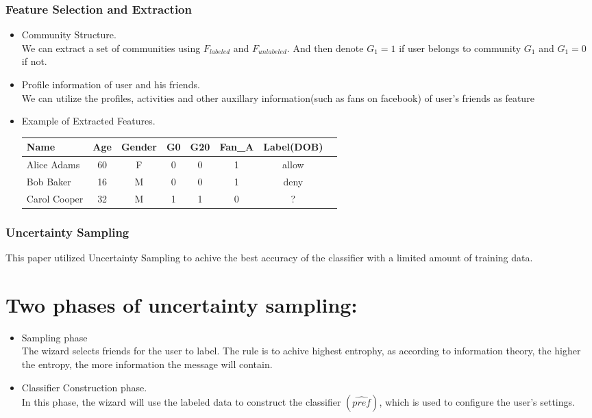 \documentclass{beamer}
\begin{document}
\begin{frame}[fragile]
\frametitle{Feature Selection and Extraction}
\begin{itemize}
\item Community Structure.\\
  We can extract a set of communities using $F_{labeled}$ and
  $F_{unlabeled}$. And then denote $G_1=1$ if user belongs to
  community $G_1$ and $G_1=0$ if not. 
\item Profile information of user and his friends. \\
  We can utilize the profiles, activities and other auxillary
  information(such as fans on facebook) of user's friends as
  feature 
\item Example of Extracted Features. \\
  \begin{tabular}{l*{6}{c}r}
    Name  & Age & Gender & G0 & G20  & Fan_A & Label(DOB) \\
    \hline
    Alice Adams  & 60 & F & 0 & 0 & 1 &  allow  \\
    Bob Baker    & 16 & M & 0 & 0 & 1 &  deny   \\
    Carol Cooper & 32 & M & 1 & 1 & 0 &  ?  \\
  \end{tabular}
\end{itemize}
\end{frame}
%
\begin{frame}
\frametitle{Uncertainty Sampling}
This paper utilized Uncertainty Sampling to achive the best accuracy of
the classifier with a limited amount of training data. 
\section*{Two phases of uncertainty sampling:}
\begin{itemize}
\item Sampling phase \\
  The wizard selects friends for the user to label. The rule is to
  achive highest entrophy, as according to information theory, the
  higher the entropy, the more information the message will contain.
\item Classifier Construction phase. \\
  In this phase, the wizard will use the labeled data to construct the
  classifier $(\widehat{pref})$, which is used to configure the user's
  settings. 
\end{itemize}
\end{frame}
\end{document}
